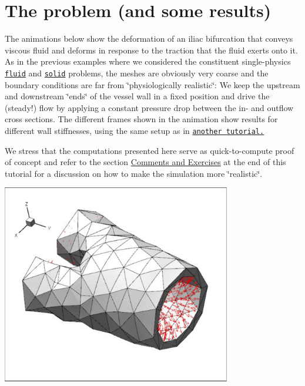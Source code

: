 \hypertarget{index_prob}{}\section{The problem (and some results)}\label{index_prob}
The animations below show the deformation of an iliac bifurcation that conveys viscous fluid and deforms in response to the traction that the fluid exerts onto it. As in the previous examples where we considered the constituent single-\/physics \href{../../../navier_stokes/vmtk_fluid/html/index.html}{\tt fluid} and \href{../../../solid/vmtk_solid/html/index.html}{\tt solid} problems, the meshes are obviously very coarse and the boundary conditions are far from \char`\"{}physiologically realistic\char`\"{}\+: We keep the upstream and downstream \char`\"{}ends\char`\"{} of the vessel wall in a fixed position and drive the (steady!) flow by applying a constant pressure drop between the in-\/ and outflow cross sections. The different frames shown in the animation show results for different wall stiffnesses, using the same setup as in \href{../../unstructured_three_d_fsi/html/index.html}{\tt another tutorial.}

We stress that the computations presented here serve as quick-\/to-\/compute proof of concept and refer to the section \hyperlink{index_comm_ex}{Comments and Exercises} at the end of this tutorial for a discussion on how to make the simulation more \char`\"{}realistic\char`\"{}.

 
\begin{DoxyImage}
\includegraphics[width=0.75\textwidth]{elastic_iliac_solid}
\end{DoxyImage}


